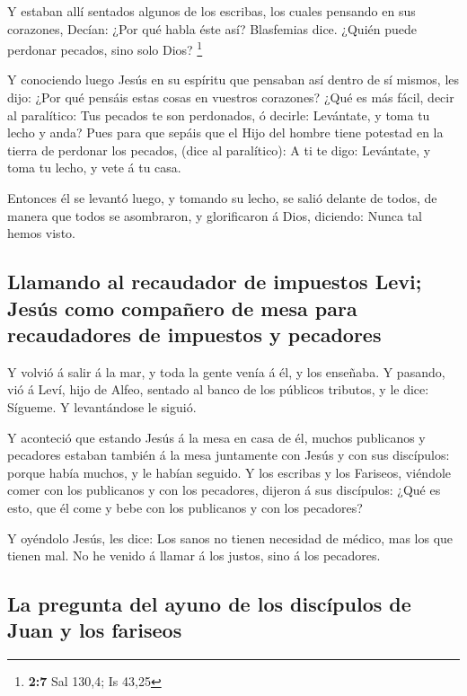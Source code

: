 Y estaban allí sentados algunos de los escribas, los
cuales pensando en sus corazones,  Decían: ¿Por qué habla
éste así? Blasfemias dice. ¿Quién puede perdonar pecados, sino solo
Dios? \footnote{\textbf{2:7} Sal 130,4; Is 43,25}

 Y conociendo luego Jesús en su espíritu que pensaban así
dentro de sí mismos, les dijo: ¿Por qué pensáis estas cosas en vuestros
corazones?  ¿Qué es más fácil, decir al paralítico: Tus
pecados te son perdonados, ó decirle: Levántate, y toma tu lecho y anda?
 Pues para que sepáis que el Hijo del hombre tiene
potestad en la tierra de perdonar los pecados, (dice al paralítico):
 A ti te digo: Levántate, y toma tu lecho, y vete á tu
casa.

 Entonces él se levantó luego, y tomando su lecho, se
salió delante de todos, de manera que todos se asombraron, y
glorificaron á Dios, diciendo: Nunca tal hemos visto.

\hypertarget{llamando-al-recaudador-de-impuestos-levi-jesuxfas-como-compauxf1ero-de-mesa-para-recaudadores-de-impuestos-y-pecadores}{%
\subsection{Llamando al recaudador de impuestos Levi; Jesús como
compañero de mesa para recaudadores de impuestos y
pecadores}\label{llamando-al-recaudador-de-impuestos-levi-jesuxfas-como-compauxf1ero-de-mesa-para-recaudadores-de-impuestos-y-pecadores}}

 Y volvió á salir á la mar, y toda la gente venía á él, y
los enseñaba.  Y pasando, vió á Leví, hijo de Alfeo,
sentado al banco de los públicos tributos, y le dice: Sígueme. Y
levantándose le siguió.

 Y aconteció que estando Jesús á la mesa en casa de él,
muchos publicanos y pecadores estaban también á la mesa juntamente con
Jesús y con sus discípulos: porque había muchos, y le habían seguido.
 Y los escribas y los Fariseos, viéndole comer con los
publicanos y con los pecadores, dijeron á sus discípulos: ¿Qué es esto,
que él come y bebe con los publicanos y con los pecadores?

 Y oyéndolo Jesús, les dice: Los sanos no tienen
necesidad de médico, mas los que tienen mal. No he venido á llamar á los
justos, sino á los pecadores.

\hypertarget{la-pregunta-del-ayuno-de-los-discuxedpulos-de-juan-y-los-fariseos}{%
\subsection{La pregunta del ayuno de los discípulos de Juan y los
fariseos}\label{la-pregunta-del-ayuno-de-los-discuxedpulos-de-juan-y-los-fariseos}}

